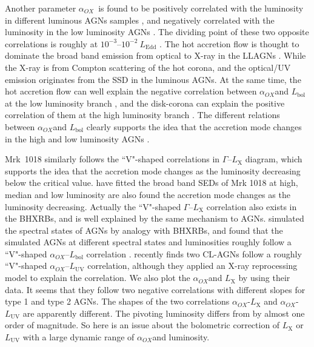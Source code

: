 \documentclass[twocolumn]{aastex63}
\newcommand{\alphaox}{$\alpha_{OX}$}
\begin{document}
Another parameter \alphaox\, is found to be positively correlated with the luminosity in different luminous AGNs samples \citep[e.g.][]{2010A&A...512A..34L, 2013A&A...550A..71V,2016ApJ...819..154L}, and negatively correlated with the luminosity in the low luminosity AGNs \citep{2011ApJ...739...64X,2017MNRAS.471.2848L}. The dividing point of these two opposite correlations is roughly at $10^{-3}$--$10^{-2}~L_\mathrm{Edd}$ \citep{2011ApJ...739...64X,2017MNRAS.471.2848L}. The hot accretion flow is thought to dominate the broad band emission from optical to X-ray in the LLAGNs \citep[see reviews in ][]{2014ARA&A..52..529Y}. While the X-ray is from Compton scattering of the hot corona, and the optical/UV emission originates from the SSD in the luminous AGNs. At the same time, the hot accretion flow can well explain the negative correlation between \alphaox and $L_\mathrm{bol}$ at the low luminosity branch \citep{2011ApJ...739...64X,2017MNRAS.471.2848L}, and the disk-corona can explain the positive correlation of them at the high luminosity branch \citep{2017A&A...602A..79L, 2018MNRAS.480.1247K,2019A&A...628A.135A}. The different relations between \alphaox and $L_\mathrm{bol}$ clearly supports the idea that the accretion mode changes in the high and low luminosity AGNs \citep{2011MNRAS.413.2259S,2019ApJ...883...76R}. 

Mrk~1018 similarly follows the ``V"-shaped correlations in $\Gamma$--$L_\mathrm{X}$ diagram, which supports the idea that the accretion mode changes as the luminosity decreasing below the critical value. \citet{2018MNRAS.480.3898N} have fitted the broad band SEDs of Mrk 1018 at high, median and low luminosity are also found the accretion mode changes as the luminosity decreasing. Actually the ``V"-shaped $\Gamma$--$L_\mathrm{X}$ correlation also exists in the BHXRBs, and is well explained by the same mechanism to AGNs\citep[e.g.][]{2011A&A...530A.149Y,2015MNRAS.447.1692Y}. \citet{2011MNRAS.413.2259S} simulated the spectral states of AGNs by analogy with BHXRBs, and found that the simulated AGNs at different spectral states and luminosities roughly follow a ``V"-shaped \alphaox--$L_\mathrm{bol}$ correlation \citep[see also in ][]{2019ApJ...883...76R}. \citet{2019arXiv190904676R} recently finds two CL-AGNs follow a roughly ``V"-shaped \alphaox--$L_\mathrm{UV}$ correlation, although they applied an X-ray reprocessing model to explain the correlation. We also plot the \alphaox and $L_\mathrm{X}$ by using their data. It seems that they follow two negative correlations with different slopes for type 1 and type 2 AGNs. The shapes of the two correlations \alphaox-$L_\mathrm{X}$ and \alphaox-$L_\mathrm{UV}$ are apparently different. The pivoting luminosity differs from \citet{2011ApJ...739...64X} by almost one order of magnitude. So here is an issue about the bolometric correction of $L_\mathrm{X}$ or $L_\mathrm{UV}$ with a large dynamic range of \alphaox and luminosity. 
\end{document}
